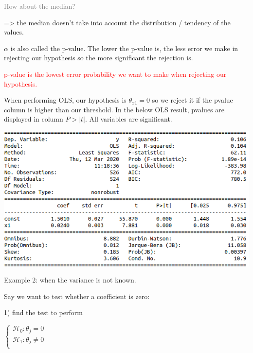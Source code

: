 \textcolor{gray}{How about the median?}

=> the median doesn't take into account the distribution / tendency of the values.

\vspace{5mm}

$\alpha$ is also called the p-value. The lower the p-value is, the less error we make in rejecting our hypothesis so the more significant the rejection is.

\textcolor{red}{p-value is the lowest error probability we want to make when rejecting our hypothesis.}

\vspace{5mm}

When performing OLS, our hypothesis is $\theta_{x1}=0$ so we reject it if the pvalue column is higher than our threshold. In the below OLS result, pvalues are displayed in column $P>|t|$. All variables are significant.

\begin{center}
\includegraphics[scale=0.5]{OLS_pvalue.png}
\end{center}

Example 2:  when the variance is not known.

\vspace{5mm}

Say we want to test whether a coefficient is zero:

1) find the test to perform

\vspace{5mm}

$
\left\{
    \begin{array}{ll}
        \mathcal{H}_0: \theta_j=0 \\
        \mathcal{H}_1: \theta_j \neq 0 \\
    \end{array}
\right.
$

